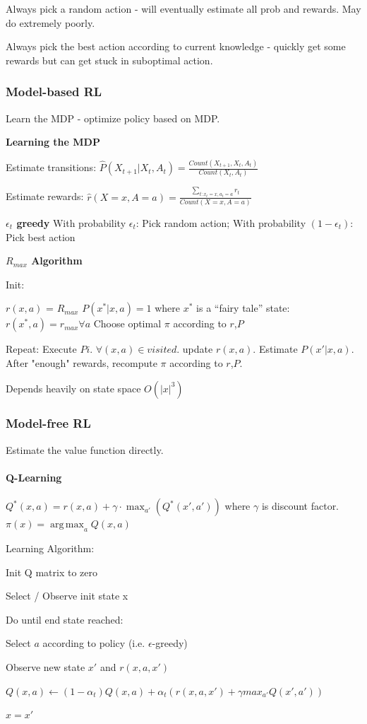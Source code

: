 \documentclass[a4paper, 11pt]{scrartcl}
\DeclareMathOperator*{\argmax}{arg\,max}
\begin{document}
\begin{multicols*}{3}
\begin{compactitem}
	\item Always pick a random action - will eventually estimate all prob and rewards. May do extremely poorly. 
	\item Always pick the best action according to current knowledge - quickly get some rewards but can get stuck in suboptimal action.
\end{compactitem}

\subsubsection{Model-based RL }
Learn the MDP - optimize policy based on MDP.

\textbf{Learning the MDP}

Estimate transitions: $\hat{P}(X_{t+1} | X_t, A_t) = \frac{Count(X_{t+1}, X_t, A_t)}{Count(X_t, A_t)}$

Estimate rewards: $\hat{r}(X=x, A= a) = \frac{\sum_{t: x_t = x, a_t = a} r_t}{Count(X = x, A = a)}$

\textbf{ $\epsilon_t$ greedy}
With probability  $\epsilon_t$: Pick random action; With probability $(1- \epsilon_t)$: Pick best action

\textbf{$R_{max}$ Algorithm}

Init:

$r(x, a)$ = $R_{max}$
$P(x^* | x, a) = 1$ where $x^*$ is a “fairy tale” state: $r(x^*, a) = r_{max}  \forall a$
Choose optimal $\pi$ according to $r$,$P$

Repeat:
Execute $Pi$. $\forall(x,a)\in visited$. update $r(x,a)$. Estimate $P(x'|x,a)$.
After "enough" rewards, recompute $\pi$ according to $r$,$P$.

Depends heavily on state space $O(|x|^3)$


\subsubsection{Model-free RL}
Estimate the value function directly.

\paragraph{Q-Learning}
$Q^*(x, a) = r(x, a) + \gamma \cdot \max_{a'} (Q^*(x', a'))$ where $\gamma$ is discount factor. $\pi(x) = \argmax_a Q(x, a )$

Learning Algorithm:
\begin{compactitem}
	\item Init Q matrix to zero
	\item Select / Observe init state x
	\item Do until end state reached:
	\item Select $a$ according to policy (i.e. $\epsilon$-greedy)
	\item Observe new state $x'$ and $r(x,a,x')$
	\item $Q(x, a) \leftarrow (1-\alpha_t)Q(x, a)  + \alpha_t(r(x,a,x') + \gamma max_{a'}Q(x',a'))$
	\item $x = x'$
\end{compactitem}


\end{multicols*}
\end{document}
